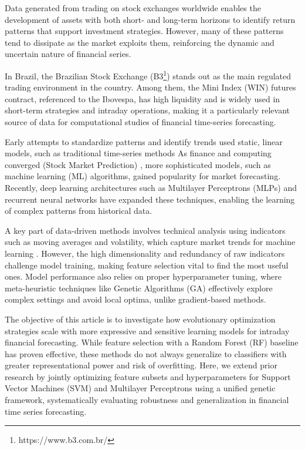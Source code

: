 \documentclass[conference]{IEEEtran}
\begin{document}
Data generated from trading on stock exchanges worldwide enables the development of assets with both short- and long-term horizons to identify return patterns that support investment strategies. However, many of these patterns tend to dissipate as the market exploits them, reinforcing the dynamic and uncertain nature of financial series.

In Brazil, the Brazilian Stock Exchange (B3\footnote{https://www.b3.com.br/}) stands out as the main regulated trading environment in the country. Among them, the Mini Index (WIN) futures contract, referenced to the Ibovespa, has high liquidity and is widely used in short-term strategies and intraday operations, making it a particularly relevant source of data for computational studies of financial time-series forecasting.

Early attempts to standardize patterns and identify trends used static, linear models, such as traditional time-series methods %
As finance and computing converged (Stock Market Prediction) \cite{jiang2021applications}, more sophisticated models, such as machine learning (ML) algorithms, gained popularity for market forecasting. Recently, deep learning architectures such as Multilayer Perceptrons (MLPs) and recurrent neural networks have expanded these techniques, enabling the learning of complex patterns from historical data.

A key part of data-driven methods involves technical analysis using indicators such as moving averages and volatility, which capture market trends for machine learning \cite{nabipour2020predicting}. However, the high dimensionality and redundancy of raw indicators challenge model training, making feature selection vital to find the most useful ones. Model performance also relies on proper hyperparameter tuning, where meta-heuristic techniques like Genetic Algorithms (GA) \cite{chung2018genetic} effectively explore complex settings and avoid local optima, unlike gradient-based methods.

The objective of this article is to investigate how evolutionary optimization strategies scale with more expressive and sensitive learning models for intraday financial forecasting. While feature selection with a Random Forest (RF) baseline has proven effective, these methods do not always generalize to classifiers with greater representational power and risk of overfitting. Here, we extend prior research by jointly optimizing feature subsets and hyperparameters for Support Vector Machines (SVM) and Multilayer Perceptrons using a unified genetic framework, systematically evaluating robustness and generalization in financial time series forecasting.
\end{document}
